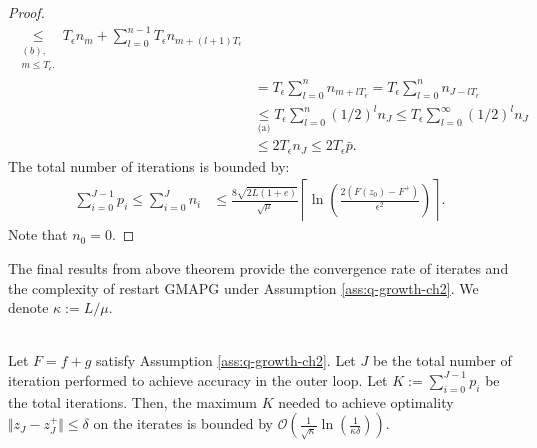 \documentclass[12pt]{report}
\begin{document}
\begin{proof}
\begin{align*}
                \underset{\substack{(b), \\ m \le T_\epsilon.}}\le T_\epsilon n_m + \sum_{l = 0}^{n - 1} T_\epsilon n_{m + (l + 1)T_\epsilon}
                \\
                &= T_\epsilon \sum_{l = 0}^{n} n_{m + lT_\epsilon} = T_\epsilon \sum_{l = 0}^{n} n_{J - lT_\epsilon}
                \\
                &\underset{\text{(a)}}{\le} T_\epsilon \sum_{l = 0}^{n} (1/2)^l n_J \le T_\epsilon \sum_{l = 0}^{\infty} (1/2)^l n_J
                \\
                &\le 2T_\epsilon n_J \le 2T_\epsilon \bar p.
            \end{align*}
            The total number of iterations is bounded by: 
            \begin{align*}
                \sum_{i = 0}^{J - 1}p_i \le \sum_{i = 0}^{J} n_i &\le 
                \frac{8\sqrt{2L(1 + e)}}{\sqrt{\mu}} \left\lceil 
                \ln \left(
                    \frac{2(F(z_0) - F^+)}{\epsilon^2}
                \right) 
                \right\rceil. 
            \end{align*}
            Note that $n_0 = 0$. 
        \end{proof}
        \par
        The final results from above theorem provide the convergence rate of iterates and the complexity of restart GMAPG under Assumption \ref{ass:q-growth-ch2}. 
        We denote $\kappa := L/\mu$. 
        \begin{theorem}\;\label{thm:rgmapg-cnvg-complexity}\\
            Let $F = f + g$ satisfy Assumption \ref{ass:q-growth-ch2}. 
            Let $J$ be the total number of iteration performed to achieve accuracy in the outer loop.
            Let $K := \sum_{i = 0}^{J - 1}p_i$ be the total iterations. 
            Then, the maximum $K$ needed to achieve optimality $\Vert z_J - z_J^+\Vert \le \delta$ on the iterates is bounded by $\mathcal O\left(\frac{1}{\sqrt{\kappa}}\ln\left(\frac{1}{\kappa\delta}\right)\right)$. 
        \end{theorem}
\end{document}
